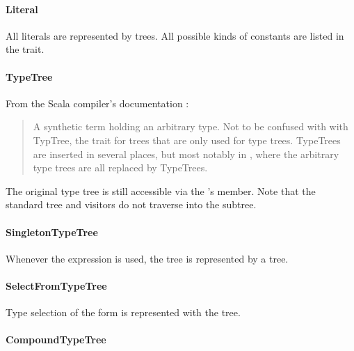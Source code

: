 \paragraph{Literal} 

\noindent All literals are represented by  trees. All possible kinds of constants are listed in the  trait.

\paragraph{TypeTree} 

\noindent From the Scala compiler's documentation \cite{AbsTypeTree}: 

\begin{quote}
A synthetic term holding an arbitrary type. Not to be confused with with TypTree, the trait for trees that are only used for type trees. TypeTrees are inserted in several places, but most notably in , where the arbitrary type trees are all replaced by TypeTrees.\end{quote}

The original type tree is still accessible via the 's  member. Note that the standard tree  and  visitors do not traverse into the  subtree.

\paragraph{SingletonTypeTree} 

\noindent Whenever the  expression is used, the tree is represented by a  tree. 

\paragraph{SelectFromTypeTree} 

\noindent Type selection of the form  is represented with the  tree.

\paragraph{CompoundTypeTree} 

